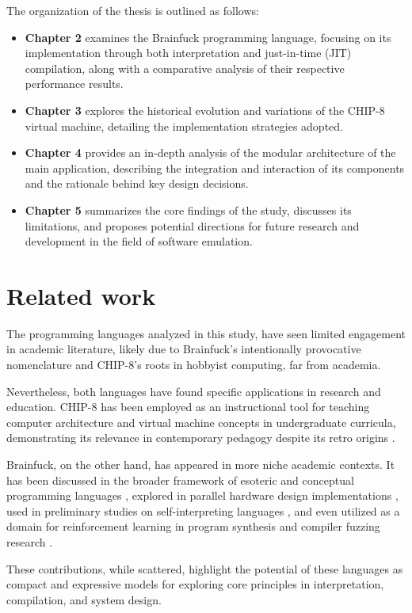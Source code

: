 \clearpage

\par The organization of the thesis is outlined as follows:

\begin{itemize}
    \item \textbf{Chapter 2} examines the Brainfuck programming language, focusing on its implementation through both interpretation and just-in-time (JIT) compilation, along with a comparative analysis of their respective performance results.
    \item \textbf{Chapter 3} explores the historical evolution and variations of the CHIP-8 virtual machine, detailing the implementation strategies adopted.
    \item \textbf{Chapter 4} provides an in-depth analysis of the modular architecture of the main application, describing the integration and interaction of its components and the rationale behind key design decisions.
    \item \textbf{Chapter 5} summarizes the core findings of the study, discusses its limitations, and proposes potential directions for future research and development in the field of software emulation.
\end{itemize}

\section{Related work}
\label{chap:ch1sec2}

\par The programming languages analyzed in this study, have seen limited engagement in academic literature, likely due to Brainfuck's intentionally provocative nomenclature and CHIP-8's roots in hobbyist computing, far from academia.

\par Nevertheless, both languages have found specific applications in research and education. CHIP-8 has been employed as an instructional tool for teaching computer architecture and virtual machine concepts in undergraduate curricula, demonstrating its relevance in contemporary pedagogy despite its retro origins \cite{Chip8Applications2019}.

\par Brainfuck, on the other hand, has appeared in more niche academic contexts. It has been discussed in the broader framework of esoteric and conceptual programming languages \cite{BFEsolang2015, BFConceptual2017}, explored in parallel hardware design implementations \cite{BFHardware2016}, used in preliminary studies on self-interpreting languages \cite{BFSelfInterpreter2003}, and even utilized as a domain for reinforcement learning in program synthesis and compiler fuzzing research \cite{BFReinforcementLearining2022}.

\par These contributions, while scattered, highlight the potential of these languages as compact and expressive models for exploring core principles in interpretation, compilation, and system design.